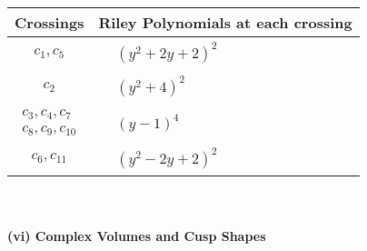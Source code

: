\documentclass[1p]{elsarticle_modified}
\theoremstyle{definition}
\begin{document}
\begin{tabular}{m{50pt}|m{274pt}}
Crossings & \hspace{64pt}Riley Polynomials at each crossing \\
\hline $$\begin{aligned}c_{1},c_{5}\end{aligned}$$&$\begin{aligned}
&(y^2+2 y+2)^2
\end{aligned}$\\
\hline $$\begin{aligned}c_{2}\end{aligned}$$&$\begin{aligned}
&(y^2+4)^2
\end{aligned}$\\
\hline $$\begin{aligned}c_{3},c_{4},c_{7}\\c_{8},c_{9},c_{10}\end{aligned}$$&$\begin{aligned}
&(y-1)^4
\end{aligned}$\\
\hline $$\begin{aligned}c_{6},c_{11}\end{aligned}$$&$\begin{aligned}
&(y^2-2 y+2)^2
\end{aligned}$\\
\hline
\end{tabular}\\~\\
\newpage\flushleft \textbf{(vi) Complex Volumes and Cusp Shapes}
\end{document}
